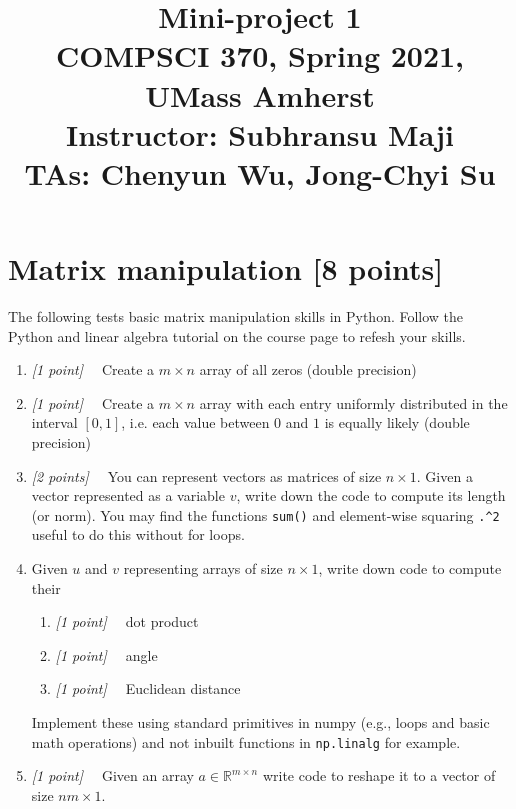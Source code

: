 \documentclass[10pt,letterpaper]{article}
\title{
  Mini-project 1 \\
  \Large{COMPSCI 370, Spring 2021, UMass Amherst} \\
  \Large{Instructor: Subhransu Maji} \\
  \Large{TAs: Chenyun Wu, Jong-Chyi Su}
}
\date{}
\newcommand{\cmd}[1] {{\color{blue}\texttt{#1}}}
\newcommand{\points}[1]{{\color{mygreen}\emph{[#1]\ \ }}}
\begin{document}
\maketitle

\renewcommand\thesubsection{\thesection.\alph{subsection}}

\newpage
\section{Matrix manipulation [8 points]}
The following tests basic matrix manipulation skills in Python. Follow
the Python and linear algebra tutorial on the course page to refesh your skills.
\begin{enumerate}
\item \points{1 point} Create a $m \times n$ array of all zeros (double precision)
\item \points{1 point} Create a $m \times n$ array with each entry
  uniformly distributed in the interval $[0, 1]$, i.e. each value
  between $0$ and $1$ is equally likely (double precision)
\item \points{2 points} You can represent vectors as matrices of size
  $n \times 1$. Given a vector represented as a variable $v$, write
  down the code to compute its length (or norm). You may find the functions \cmd{sum()} and element-wise
  squaring \cmd{.\textasciicircum 2} useful to do this without for loops.
\item  Given $u$ and $v$ representing arrays of size $n \times 1$,
  write down code to compute their
\begin{enumerate}
\item \points{1 point} dot product
\item \points{1 point} angle
\item \points{1 point} Euclidean distance
\end{enumerate}
Implement these using standard primitives in numpy (e.g., loops and basic
math operations) and not inbuilt functions in \cmd{np.linalg} for example.
\item \points{1 point} Given an array $a \in \mathbb{R}^{m\times n}$
  write code to reshape it to a vector of size $nm \times 1$.
\end{enumerate}
\end{document}
